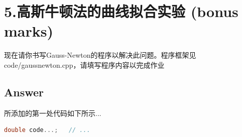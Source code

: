 \documentclass[
	12pt, %
]{fphw} %
\begin{document}
\begin{enumerate}
\begin{figure}[H]
	\end{figure}
\end{enumerate}

\clearpage
\section*{5.高斯牛顿法的曲线拟合实验 (bonus marks)}

\begin{problem}
	现在请你书写Gauss-Newton的程序以解决此问题。程序框架见code/gaussnewton.cpp，请填写程序内容以完成作业
	

\end{problem}


\subsection*{Answer}

所添加的第一处代码如下所示...

\begin{lstlisting}[language=C++, caption=题5所添代码]
	double code...;   // ...
\end{lstlisting}
\end{document}
